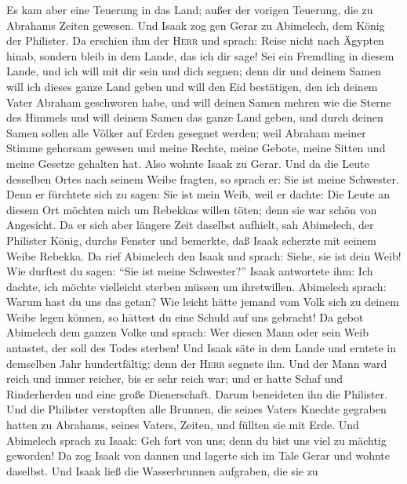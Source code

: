  Es kam aber eine Teuerung in das Land; außer der vorigen
Teuerung, die zu Abrahams Zeiten gewesen. Und Isaak zog gen Gerar zu
Abimelech, dem König der Philister.  Da erschien ihm der
\textsc{Herr} und sprach: Reise nicht nach Ägypten hinab, sondern bleib
in dem Lande, das ich dir sage!  Sei ein Fremdling in
diesem Lande, und ich will mit dir sein und dich segnen; denn dir und
deinem Samen will ich dieses ganze Land geben und will den Eid
bestätigen, den ich deinem Vater Abraham geschworen habe, 
und will deinen Samen mehren wie die Sterne des Himmels und will deinem
Samen das ganze Land geben, und durch deinen Samen sollen alle Völker
auf Erden gesegnet werden;  weil Abraham meiner Stimme
gehorsam gewesen und meine Rechte, meine Gebote, meine Sitten und meine
Gesetze gehalten hat.  Also wohnte Isaak zu Gerar.
 Und da die Leute desselben Ortes nach seinem Weibe
fragten, so sprach er: Sie ist meine Schwester. Denn er fürchtete sich
zu sagen: Sie ist mein Weib, weil er dachte: Die Leute an diesem Ort
möchten mich um Rebekkas willen töten; denn sie war schön von Angesicht.
 Da er sich aber längere Zeit daselbst aufhielt, sah
Abimelech, der Philister König, durchs Fenster und bemerkte, daß Isaak
scherzte mit seinem Weibe Rebekka.  Da rief Abimelech den
Isaak und sprach: Siehe, sie ist dein Weib! Wie durftest du sagen: ``Sie
ist meine Schwester?'' Isaak antwortete ihm: Ich dachte, ich möchte
vielleicht sterben müssen um ihretwillen.  Abimelech
sprach: Warum hast du uns das getan? Wie leicht hätte jemand vom Volk
sich zu deinem Weibe legen können, so hättest du eine Schuld auf uns
gebracht!  Da gebot Abimelech dem ganzen Volke und
sprach: Wer diesen Mann oder sein Weib antastet, der soll des Todes
sterben!  Und Isaak säte in dem Lande und erntete in
demselben Jahr hundertfältig; denn der \textsc{Herr} segnete ihn.
 Und der Mann ward reich und immer reicher, bis er sehr
reich war;  und er hatte Schaf und Rinderherden und eine
große Dienerschaft. Darum beneideten ihn die Philister. 
Und die Philister verstopften alle Brunnen, die seines Vaters Knechte
gegraben hatten zu Abrahams, seines Vaters, Zeiten, und füllten sie mit
Erde.  Und Abimelech sprach zu Isaak: Geh fort von uns;
denn du bist uns viel zu mächtig geworden!  Da zog Isaak
von dannen und lagerte sich im Tale Gerar und wohnte daselbst.
 Und Isaak ließ die Wasserbrunnen aufgraben, die sie zu
